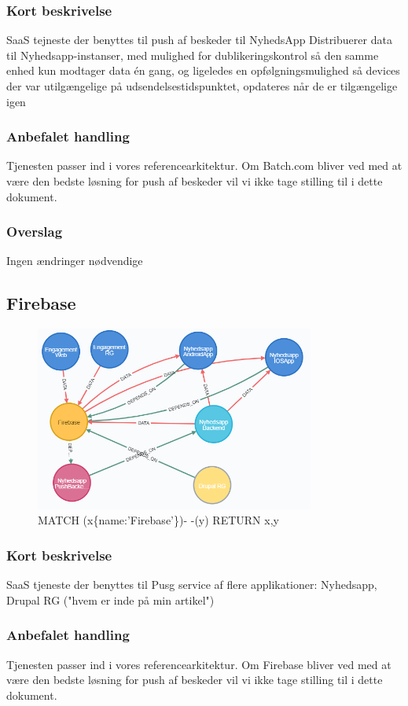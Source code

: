 \documentclass{article}
\begin{document}
\subsubsection{Kort beskrivelse}
SaaS tejneste der benyttes til push af beskeder til NyhedsApp
Distribuerer data til Nyhedsapp-instanser, med mulighed for dublikeringskontrol så den samme enhed kun modtager data én gang, og ligeledes en opfølgningsmulighed så devices der var utilgængelige på udsendelsestidspunktet, opdateres når de er tilgængelige igen
\subsubsection{Anbefalet handling}
Tjenesten passer ind i vores referencearkitektur. Om Batch.com bliver ved med at være den bedste løsning for push af beskeder vil vi ikke tage stilling til i dette dokument.
\subsubsection{Overslag}
Ingen ændringer nødvendige


\subsection{Firebase}
\begin{figure}[h]
\includegraphics[width=260pt]{Firebase.PNG}
\caption{MATCH (x\{name:'Firebase'\})- -(y) RETURN x,y}
\end{figure}
\subsubsection{Kort beskrivelse}
SaaS tjeneste der benyttes til Pusg service af flere applikationer:
Nyhedsapp, Drupal RG ("hvem er inde på min artikel")
\subsubsection{Anbefalet handling}
Tjenesten passer ind i vores referencearkitektur. Om Firebase bliver ved med at være den bedste løsning for push af beskeder vil vi ikke tage stilling til i dette dokument.
\end{document}
